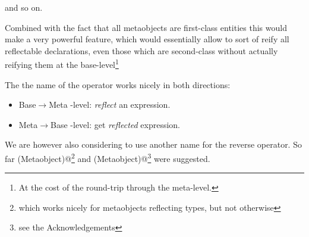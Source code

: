 and so on.

Combined with the fact that all metaobjects are first-class
entities this would make a very powerful feature, which would essentially
allow to sort of reify all reflectable declarations, even those which are
second-class without actually reifying them at the base-level\footnote
{At the cost of the round-trip through the meta-level.}

The the name of the \verb@reflexpr@ operator works nicely in both directions:
\begin{itemize}
\item Base$\rightarrow$Meta -level: {\em reflect} an expression.
\item Meta$\rightarrow$Base -level: get {\em reflected} expression.
\end{itemize}

We are however also considering to use another name for the reverse operator.
So far \verb@decltype(Metaobject)@\footnote{which works nicely for metaobjects
reflecting types, but not otherwise} and
\verb@unreflexpr(Metaobject)@\footnote{see the Acknowledgements} were suggested.

